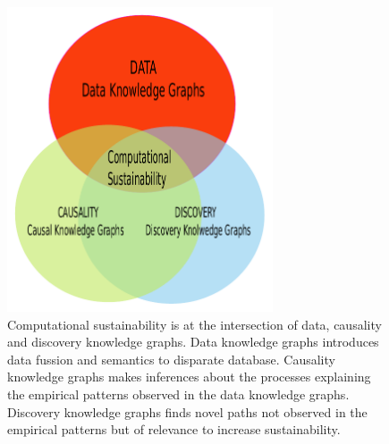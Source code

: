\documentclass[12pt,a4paper]{article}
\begin{document}
\vspace{-0.5 in}
\begin{figure}[H]
	 \centering
	 \includegraphics[width = 0.7\textwidth]{Fig0.pdf}
	 \caption{Computational sustainability is at the intersection of data, causality and discovery knowledge graphs. Data knowledge graphs introduces data fussion and semantics to disparate database. Causality knowledge graphs makes inferences about the processes explaining the empirical patterns observed in the data knowledge graphs. Discovery knowledge graphs finds novel paths not observed in the empirical patterns but of relevance to increase sustainability.}
\end{figure}   
\end{document}
